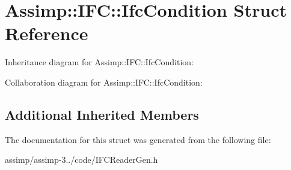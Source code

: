\hypertarget{struct_assimp_1_1_i_f_c_1_1_ifc_condition}{\section{Assimp\+:\+:I\+F\+C\+:\+:Ifc\+Condition Struct Reference}
\label{struct_assimp_1_1_i_f_c_1_1_ifc_condition}
}


Inheritance diagram for Assimp\+:\+:I\+F\+C\+:\+:Ifc\+Condition\+:


Collaboration diagram for Assimp\+:\+:I\+F\+C\+:\+:Ifc\+Condition\+:
\subsection*{Additional Inherited Members}


The documentation for this struct was generated from the following file\+:\begin{DoxyCompactItemize}
\item 
assimp/assimp-\/3../code/I\+F\+C\+Reader\+Gen.\+h\end{DoxyCompactItemize}
